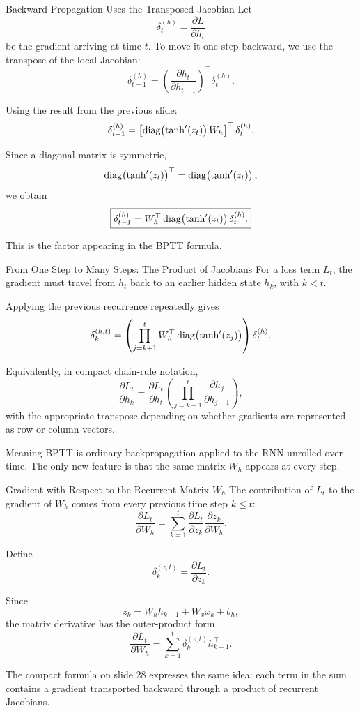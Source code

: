 \documentclass[aspectratio=169]{beamer}
\begin{document}
%
%
\begin{frame}{Backward Propagation Uses the Transposed Jacobian}
\small
Let
\[
\delta_t^{(h)} = \frac{\partial L}{\partial h_t}
\]
be the gradient arriving at time $t$. To move it one step backward, we use the transpose of the local Jacobian:
\[
\delta_{t-1}^{(h)}
= \left(\frac{\partial h_t}{\partial h_{t-1}}\right)^{\top}
\delta_t^{(h)}.
\]

Using the result from the previous slide:
\[
\delta_{t-1}^{(h)}
= \left[\operatorname{diag}\!\left(\tanh'(z_t)\right) W_h\right]^{\top}
\delta_t^{(h)}.
\]

Since a diagonal matrix is symmetric,
\[
\operatorname{diag}\!\left(\tanh'(z_t)\right)^{\top}
= \operatorname{diag}\!\left(\tanh'(z_t)\right),
\]
we obtain
\[
\boxed{
\delta_{t-1}^{(h)}
= W_h^{\top}\operatorname{diag}\!\left(\tanh'(z_t)\right)\delta_t^{(h)}.
}
\]

This is the factor appearing in the BPTT formula.
\end{frame}
%
%
\begin{frame}{From One Step to Many Steps: The Product of Jacobians}
\small
For a loss term $L_t$, the gradient must travel from $h_t$ back to an earlier hidden state $h_k$, with $k<t$.

Applying the previous recurrence repeatedly gives
\[
\delta_k^{(h,t)}
=
\left(
\prod_{j=k+1}^{t}
W_h^{\top}\operatorname{diag}\!\left(\tanh'(z_j)\right)
\right)
\delta_t^{(h)}.
\]

Equivalently, in compact chain-rule notation,
\[
\frac{\partial L_t}{\partial h_k}
=
\frac{\partial L_t}{\partial h_t}
\left(
\prod_{j=k+1}^{t}
\frac{\partial h_j}{\partial h_{j-1}}
\right),
\]
with the appropriate transpose depending on whether gradients are represented as row or column vectors.

\begin{block}{Meaning}
BPTT is ordinary backpropagation applied to the RNN unrolled over time. The only new feature is that the same matrix $W_h$ appears at every step.
\end{block}
\end{frame}
%
%
\begin{frame}{Gradient with Respect to the Recurrent Matrix $W_h$}
\small
The contribution of $L_t$ to the gradient of $W_h$ comes from every previous time step $k \leq t$:
\[
\frac{\partial L_t}{\partial W_h}
= \sum_{k=1}^{t}
\frac{\partial L_t}{\partial z_k}
\frac{\partial z_k}{\partial W_h}.
\]

Define
\[
\delta_k^{(z,t)} = \frac{\partial L_t}{\partial z_k}.
\]

Since
\[
z_k = W_h h_{k-1} + W_x x_k + b_h,
\]
the matrix derivative has the outer-product form
\[
\boxed{
\frac{\partial L_t}{\partial W_h}
= \sum_{k=1}^{t}
\delta_k^{(z,t)} h_{k-1}^{\top}.
}
\]

The compact formula on slide 28 expresses the same idea: each term in the sum contains a gradient transported backward through a product of recurrent Jacobians.
\end{frame}
\end{document}
